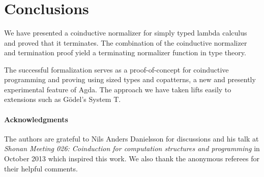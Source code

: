 \documentclass[preliminary,copyright,creativecommons]{eptcs}
\newenvironment{code}{\verbatim}{\endverbatim}
\begin{document}
\begin{code}\> \<[17]\>[17]\AgdaSymbol{:} \<[20]\>[20]   \AgdaSymbol{(} \AgdaSymbol{:}   \AgdaSymbol{)}         \<\\
\>    \<[17]\>[17]\AgdaSymbol{=} \<[20]\>[20] \<[25]\>[25] \AgdaInductiveConstructor{,}  \AgdaInductiveConstructor{,}  \<[39]\>[39]\AgdaSymbol{=}   \AgdaSymbol{(} \AgdaSymbol{)} \AgdaSymbol{(} \AgdaSymbol{)}\<\\
\>[4]\<[25]\>[25] \AgdaInductiveConstructor{,}  \<[39]\>[39]\AgdaSymbol{=}    \<\\
\>[0]\<[20]\>[20] \<[25]\>[25] \AgdaInductiveConstructor{,}    \<\end{code}


\section{Conclusions}

We have presented a coinductive normalizer for
simply typed lambda calculus and proved that it terminates. The
combination of the coinductive normalizer and termination proof yield
a terminating normalizer function in type theory.

The successful formalization serves as a proof-of-concept for
coinductive programming and proving using sized types and copatterns,
a new and presently experimental feature of Agda. The approach we have
taken lifts easily to extensions such as G\"odel's System T.

\paragraph*{Acknowledgments}

The authors are grateful to Nils Anders Danielsson for discussions and
his talk at \emph{Shonan Meeting 026: Coinduction for computation
structures and programming} in October 2013 which inspired this
work. We also thank the anonymous referees for their helpful comments.
\end{document}
